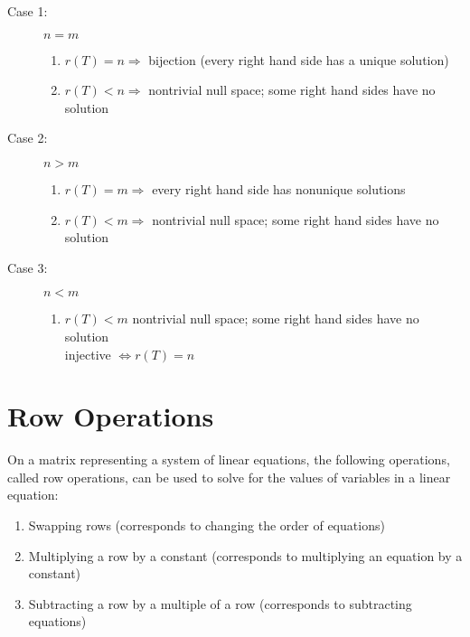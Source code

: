 \documentclass{article}
\begin{document}
\begin{description}
	\item[Case 1:] $n=m$
	\begin{enumerate}
		\item $r(T)=n \Rightarrow$ bijection (every right hand side has a unique solution)
		\item $r(T)<n \Rightarrow$ nontrivial null space; some right hand sides have no solution
	\end{enumerate}
	\item[Case 2:] $n>m$
	\begin{enumerate}
		\item $r(T)=m \Rightarrow$ every right hand side has nonunique solutions
		\item $r(T)<m \Rightarrow$ nontrivial null space; some right hand sides have no solution
	\end{enumerate} 
	\item[Case 3:] $n<m$
	\begin{enumerate}
		\item $r(T)<m$ nontrivial null space; some right hand sides have no solution \\
			injective $\Leftrightarrow r(T)=n$
	\end{enumerate}
\end{description}

\section{Row Operations}
On a matrix representing a system of linear equations, the following operations, called row operations, can be used to solve for the values of variables in a linear equation:
\begin{enumerate}
	\item Swapping rows (corresponds to changing the order of equations)
	\item Multiplying a row by a constant (corresponds to multiplying an equation by a constant)
	\item Subtracting a row by a multiple of a row (corresponds to subtracting equations)
\end{enumerate}
\end{document}
